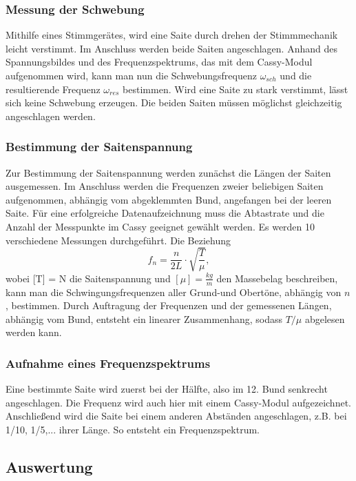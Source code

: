 \documentclass[a4paper, 11pt]{article}
\begin{document}
\subsubsection{Messung der Schwebung}
Mithilfe eines Stimmgerätes, wird eine Saite durch drehen der Stimmmechanik leicht verstimmt. Im Anschluss werden beide Saiten angeschlagen. Anhand des Spannungsbildes und des Frequenzspektrums, das mit dem Cassy-Modul aufgenommen wird, kann man nun die Schwebungsfrequenz $\omega_{sch}$ und die resultierende Frequenz $\omega_{res}$ bestimmen. Wird eine Saite zu stark verstimmt, lässt sich keine Schwebung erzeugen. Die beiden Saiten müssen möglichst gleichzeitig angeschlagen werden.

\subsubsection{Bestimmung der Saitenspannung}
Zur Bestimmung der Saitenspannung werden zunächst die Längen der Saiten ausgemessen. Im Anschluss werden die Frequenzen zweier beliebigen Saiten aufgenommen, abhängig vom abgeklemmten Bund, angefangen bei der leeren Saite. Für eine erfolgreiche Datenaufzeichnung muss die Abtastrate und die Anzahl der Messpunkte im Cassy geeignet gewählt werden. Es werden 10 verschiedene Messungen durchgeführt. Die Beziehung
\begin{equation}
\label{Frequenz Gitarre}
f_n = \frac{n}{2 L} \cdot \sqrt{\frac{T}{\mu}},
\end{equation} 
wobei [T] = N die Saitenspannung und $[\mu] = \frac{kg}{m}$ den Massebelag beschreiben, kann man die Schwingungsfrequenzen aller Grund-und Obertöne, abhängig von $n$, bestimmen. 
Durch Auftragung der Frequenzen und der gemessenen Längen, abhängig vom Bund, entsteht ein linearer Zusammenhang, sodass $T/\mu$ abgelesen werden kann.  

\subsubsection{Aufnahme eines Frequenzspektrums} 
Eine bestimmte Saite wird zuerst bei der Hälfte, also im 12. Bund senkrecht angeschlagen. Die Frequenz wird auch hier mit einem Cassy-Modul aufgezeichnet. Anschließend wird die Saite bei einem anderen Abständen angeschlagen, z.B. bei 1/10, 1/5,... ihrer Länge. So entsteht ein Frequenzspektrum.

\subsection{Auswertung}
\end{document}
